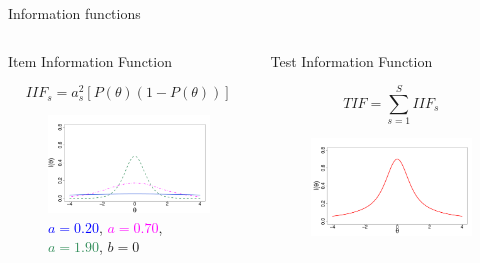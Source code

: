 \documentclass{beamer} %
\begin{document}
\begin{frame}{Information functions}
	\vspace*{-5mm}
	\begin{columns}[T]
		\begin{column}{.50\linewidth}
				\begin{center}
				Item Information Function
			\end{center}
			\begin{equation}\label{eq:IIF}
			\mathit{IIF}_s = a_s^2[P(\theta)(1-P(\theta))]
		\end{equation}
	\pause
	\vspace*{-4mm}
	\begin{figure}
		\centering
			\includegraphics[width=\linewidth]{img/iifs.pdf}
			\caption{\footnotesize{\textcolor{blue}{$a = 0.20$}, \textcolor{magenta}{$a = 0.70$}, 
			\textcolor{seagreen}{$a = 1.90$}, $b=0$}}
\label{sub:iif}
	\end{figure}
		\end{column}
\begin{column}{.50\linewidth}
	\pause
	\begin{center}
		Test Information Function
	\end{center}
	\begin{equation}\label{eq:TIF}
	\mathit{TIF} = \displaystyle \sum_{s=1}^{S} \mathit{IIF}_s
\end{equation}
\vspace*{-6mm}
\pause
\begin{figure}
	\centering\includegraphics[width=\linewidth]{img/tif.pdf}

\end{figure}
\end{column}
\end{columns}
\end{frame}
\end{document}
